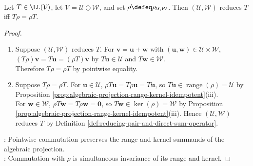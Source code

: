 \begin{proposition} \label{prop:reducing-pairs-and-algebraic-projections} \\
Let $T\in\LL(\mathcal{V})$, let $\mathcal{V}=\mathcal{U}\oplus\mathcal{W}$, and set $\rho\defeq\rho_{\mathcal{U},\mathcal{W}}$. Then $(\mathcal{U},\mathcal{W})$ reduces $T$ iff $T\rho=\rho T$.
\begin{proof}
\begin{enumerate}[label=\roman*.]
\setlength{\itemsep}{0pt}
\item[$(\Rightarrow)$] Suppose $(\mathcal{U},\mathcal{W})$ reduces $T$. For $\mathbf{v}=\mathbf{u}+\mathbf{w}$ with $(\mathbf{u},\mathbf{w})\in\mathcal{U}\times\mathcal{W}$, $(T\rho)\mathbf{v}=T\mathbf{u}=(\rho T)\mathbf{v}$ by $T\mathbf{u}\in\mathcal{U}$ and $T\mathbf{w}\in\mathcal{W}$.\\
Therefore $T\rho=\rho T$ by pointwise equality.
\item[$(\Leftarrow)$] Suppose $T\rho=\rho T$. For $\mathbf{u}\in\mathcal{U}$, $\rho T\mathbf{u}=T\rho\mathbf{u}=T\mathbf{u}$, so $T\mathbf{u}\in\operatorname{range}(\rho)=\mathcal{U}$ by Proposition \ref{prop:algebraic-projection-range-kernel-idempotent}(iii).\\
For $\mathbf{w}\in\mathcal{W}$, $\rho T\mathbf{w}=T\rho\mathbf{w}=\mathbf{0}$, so $T\mathbf{w}\in\ker(\rho)=\mathcal{W}$ by Proposition \ref{prop:algebraic-projection-range-kernel-idempotent}(iii). Hence $(\mathcal{U},\mathcal{W})$ reduces $T$ by Definition \ref{def:reducing-pair-and-direct-sum-operator}.
\end{enumerate}
: Pointwise commutation preserves the range and kernel summands of the algebraic projection.\\
: Commutation with $\rho$ is simultaneous invariance of its range and kernel.
\end{proof}
\end{proposition}

